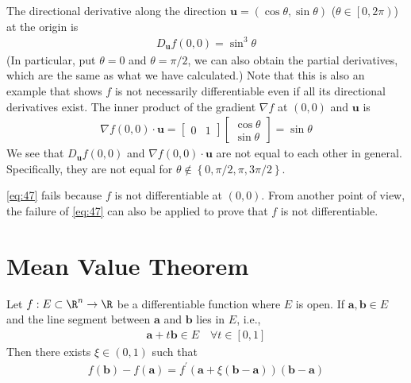 \documentclass[thmcnt=section, 12pt]{elegantbook}
\begin{document}
\begin{example}
    \par The directional derivative along the direction $\mathbf{u} = (\cos\theta, \sin\theta)$ ($\theta \in \left[0, 2\pi\right)$) at the origin is 
    \begin{align*}
        D_{\mathbf{u}}f (0,0) = \sin^3 \theta
    \end{align*}
    (In particular, put $\theta = 0$ and $\theta = \pi / 2$, we can also obtain the partial derivatives, which are the same as what we have calculated.)
    Note that this is also an example that shows $f$ is not necessarily differentiable even if all its directional derivatives exist.
    The inner product of the gradient $\nabla f$ at $(0,0)$ and $\mathbf{u}$ is 
    \begin{align*}
        \nabla f (0,0) \cdot \mathbf{u}
        = \begin{bmatrix}
            0 & 1
        \end{bmatrix} \begin{bmatrix}
            \cos\theta \\ \sin\theta
        \end{bmatrix}
        = \sin\theta
    \end{align*}
    We see that $D_{\mathbf{u}}f (0,0)$ and $\nabla f (0,0) \cdot \mathbf{u}$ are not equal to each other in general. Specifically, they are not equal for $\theta \notin \left\{0,\pi/2,\pi,3\pi/2\right\}$. 

    \par \eqref{eq:47} fails because $f$ is not differentiable at $(0,0)$. From another point of view, the failure of \eqref{eq:47} can also be applied to prove that $f$ is not differentiable.
\end{example}


\section{Mean Value Theorem}


\begin{theorem} \label{thm:21}
    Let $f: E \subset \R^n \to \R$ be a differentiable function where $E$ is open. If $\mathbf{a}, \mathbf{b} \in E$ and the line segment between $\mathbf{a}$ and $\mathbf{b}$ lies in $E$, i.e., 
    \begin{align*}
        \mathbf{a} + t \mathbf{b} \in E 
        \quad \forall t \in [0,1]
    \end{align*}
    Then there exists $\xi \in (0, 1)$ such that 
    \begin{align}
        f(\mathbf{b}) - f(\mathbf{a})
        = f^\prime(\mathbf{a} + \xi (\mathbf{b} - \mathbf{a})) (\mathbf{b} - \mathbf{a})
        \label{eq:43}
    \end{align}
\end{theorem}
\end{document}
